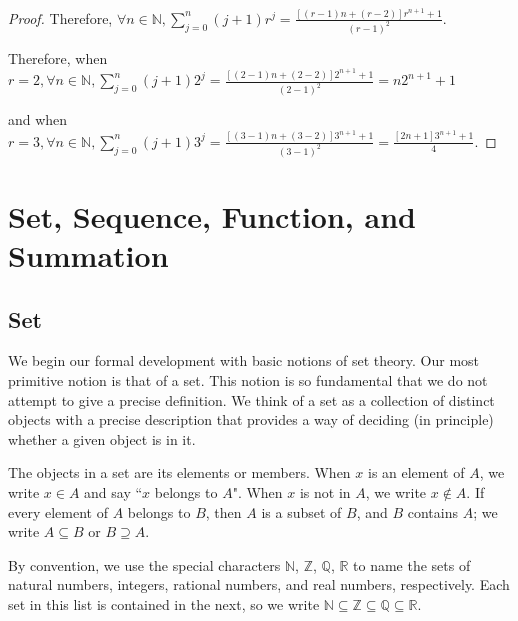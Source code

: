 \documentclass[
	12pt, %
	fleqn, %
	a4paper, %
]{LegrandOrangeBook}
\begin{document}
\begin{proof}
Therefore, \( \forall n \in \mathbb{N}, \sum_{j=0}^{n} (j + 1)r^j = \frac{[(r - 1)n + (r - 2)]r^{n+1} + 1}{(r - 1)^2} \).

Therefore, when \( r = 2, \forall n \in \mathbb{N}, \sum_{j=0}^{n} (j + 1)2^j = \frac{[(2 - 1)n + (2 - 2)]2^{n+1} + 1}{(2 - 1)^2} = n2^{n+1} + 1 \)

and when \( r = 3, \forall n \in \mathbb{N}, \sum_{j=0}^{n} (j + 1)3^j = \frac{[(3 - 1)n + (3 - 2)]3^{n+1} + 1}{(3 - 1)^2} = \frac{[2n + 1]3^{n+1} + 1}{4} \).
\end{proof}






\chapterspaceabove{6.75cm} 
\chapterspacebelow{7.25cm} 
\chapter{Set, Sequence, Function, and Summation}
\section{Set}
    We begin our formal development with basic notions of set theory. Our most primitive notion is that of a set. This notion is so fundamental that we do not attempt to give a precise definition. We think of a set as a collection of distinct objects with a precise description that provides a way of deciding (in principle) whether a given object is in it.

\begin{definition}[Set]
The objects in a set are its elements or members. When \( x \) is an element of \( A \), we write \( x \in A \) and say ``\( x \) belongs to \( A \)". When \( x \) is not in \( A \), we write \( x \notin A \). If every element of \( A \) belongs to \( B \), then \( A \) is a subset of \( B \), and \( B \) contains \( A \); we write \( A \subseteq B \) or \( B \supseteq A \).
\end{definition}

\begin{remark}
By convention, we use the special characters \( \mathbb{N} \), \( \mathbb{Z} \), \( \mathbb{Q} \), \( \mathbb{R} \) to name the sets of natural numbers, integers, rational numbers, and real numbers, respectively. Each set in this list is contained in the next, so we write \( \mathbb{N} \subseteq \mathbb{Z} \subseteq \mathbb{Q} \subseteq \mathbb{R} \).
\end{remark}
\end{document}
